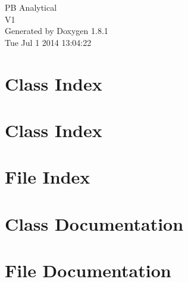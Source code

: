 \documentclass{book}
\begin{document}
\hypersetup{pageanchor=false,citecolor=blue}
\begin{titlepage}
\vspace*{7cm}
\begin{center}
{\Large P\-B Analytical \\[1ex]\large V1 }\\
\vspace*{1cm}
{\large Generated by Doxygen 1.8.1}\\
\vspace*{0.5cm}
{\small Tue Jul 1 2014 13:04:22}\\
\end{center}
\end{titlepage}
\clearemptydoublepage
{}
\tableofcontents
\clearemptydoublepage
{}
\hypersetup{pageanchor=true,citecolor=blue}
\chapter{Class Index}

\chapter{Class Index}

\chapter{File Index}

\chapter{Class Documentation}


















\chapter{File Documentation}



























\printindex
\end{document}
